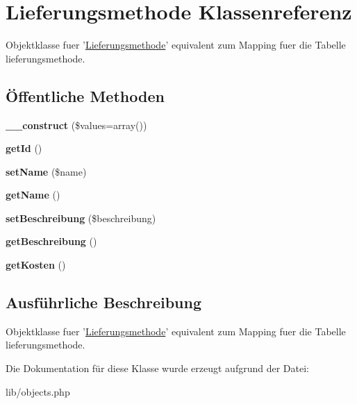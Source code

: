 \hypertarget{classLieferungsmethode}{\section{\-Lieferungsmethode \-Klassenreferenz}
\label{classLieferungsmethode}
}


\-Objektklasse fuer '\hyperlink{classLieferungsmethode}{\-Lieferungsmethode}' equivalent zum \-Mapping fuer die \-Tabelle lieferungsmethode.  


\subsection*{Öffentliche \-Methoden}
\begin{DoxyCompactItemize}
\item 
\hypertarget{classLieferungsmethode_ad1d600b2622c967cfff2191f7b36422b}{{\bfseries \-\_\-\-\_\-construct} (\$values=array())}\label{classLieferungsmethode_ad1d600b2622c967cfff2191f7b36422b}

\item 
\hypertarget{classLieferungsmethode_a24e16684ae918d2d78dcea2f09c9623d}{{\bfseries get\-Id} ()}\label{classLieferungsmethode_a24e16684ae918d2d78dcea2f09c9623d}

\item 
\hypertarget{classLieferungsmethode_af3cd8c887aa29c755e762d543f1a393d}{{\bfseries set\-Name} (\$name)}\label{classLieferungsmethode_af3cd8c887aa29c755e762d543f1a393d}

\item 
\hypertarget{classLieferungsmethode_acdff00849db9d887688c5d5ed4c4a075}{{\bfseries get\-Name} ()}\label{classLieferungsmethode_acdff00849db9d887688c5d5ed4c4a075}

\item 
\hypertarget{classLieferungsmethode_afeea41a4a0efe68d6d4114445827ec3f}{{\bfseries set\-Beschreibung} (\$beschreibung)}\label{classLieferungsmethode_afeea41a4a0efe68d6d4114445827ec3f}

\item 
\hypertarget{classLieferungsmethode_ad4677caaee50fb9f25f7569a65300723}{{\bfseries get\-Beschreibung} ()}\label{classLieferungsmethode_ad4677caaee50fb9f25f7569a65300723}

\item 
\hypertarget{classLieferungsmethode_a3d617c5cfd6cf93a06a5399c47208513}{{\bfseries get\-Kosten} ()}\label{classLieferungsmethode_a3d617c5cfd6cf93a06a5399c47208513}

\end{DoxyCompactItemize}


\subsection{\-Ausführliche \-Beschreibung}
\-Objektklasse fuer '\hyperlink{classLieferungsmethode}{\-Lieferungsmethode}' equivalent zum \-Mapping fuer die \-Tabelle lieferungsmethode. 

\-Die \-Dokumentation für diese \-Klasse wurde erzeugt aufgrund der \-Datei\-:\begin{DoxyCompactItemize}
\item 
lib/objects.\-php\end{DoxyCompactItemize}
